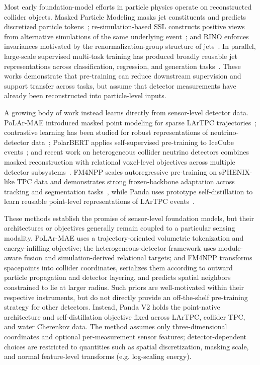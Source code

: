 Most early foundation-model efforts in particle physics operate on reconstructed collider objects. Masked Particle Modeling masks jet constituents and predicts discretized particle tokens~\citep{golling2024maskedparticlemodelingsets,leigh2024tokenizationneededmaskedparticle}; re-simulation-based SSL constructs positive views from alternative simulations of the same underlying event~\citep{r3sl,rieck2025selfsupervisedlearningstrategiesjet}; and RINO enforces invariances motivated by the renormalization-group structure of jets~\citep{hao2025rinorenormalizationgroupinvariance}. In parallel, large-scale supervised multi-task training has produced broadly reusable jet representations across classification, regression, and generation tasks~\citep{Mikuni_2025,bhimji2025omnilearnedfoundationmodelframework, krzmanc2026cross}. These works demonstrate that pre-training can reduce downstream supervision and support transfer across tasks, but assume that detector measurements have already been reconstructed into particle-level inputs.

A growing body of work instead learns directly from sensor-level detector data. PoLAr-MAE introduced masked point modeling for sparse LArTPC trajectories~\citep{polarmae}; contrastive learning has been studied for robust representations of neutrino-detector data~\citep{wilkinson2025contrastivelearningrobustrepresentations}; PolarBERT applies self-supervised pre-training to IceCube events~\citep{polarbert}; and recent work on heterogeneous collider neutrino detectors combines masked reconstruction with relational voxel-level objectives across multiple detector subsystems~\citep{alonsomonsalve2026foundationstylemodelsenergyfrontierheterogeneous}. FM4NPP scales autoregressive pre-training on sPHENIX-like TPC data and demonstrates strong frozen-backbone adaptation across tracking and segmentation tasks~\citep{park2025fm4npp}, while Panda uses prototype self-distillation to learn reusable point-level representations of LArTPC events~\citep{panda}.

These methods establish the promise of sensor-level foundation models, but their architectures or objectives generally remain coupled to a particular sensing modality. PoLAr-MAE uses a trajectory-oriented volumetric tokenization and energy-infilling objective; the heterogeneous-detector framework uses module-aware fusion and simulation-derived relational targets; and FM4NPP transforms spacepoints into collider coordinates, serializes them according to outward particle propagation and detector layering, and predicts spatial neighbors constrained to lie at larger radius. Such priors are well-motivated within their respective instruments, but do not directly provide an off-the-shelf pre-training strategy for other detectors. Instead, Panda V2 holds the point-native architecture and self-distillation objective fixed across LArTPC, collider TPC, and water Cherenkov data. The method assumes only three-dimensional coordinates and optional per-measurement sensor features; detector-dependent choices are restricted to quantities such as spatial discretization, masking scale, and normal feature-level transforms (e.g. log-scaling energy).

